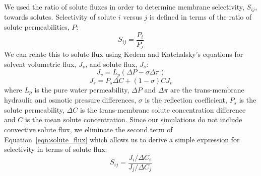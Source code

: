 \documentclass[12pt]{article}
\begin{document}
  We used the ratio of solute fluxes in order to determine membrane selectivity, $S_{ij}$,
  towards solutes. Selectivity of solute $i$ versus $j$ is defined in terms of the
  ratio of solute permeabilities, $P$:~\cite{guo_pervaporation_2004}
  \begin{equation}
  S_{ij} = \frac{P_i}{P_j}
  \end{equation}
  We can relate this to solute flux using Kedem and Katchalsky's equations for 
  solvent volumetric flux, $J_v$, and solute flux, $J_s$:~\cite{kedem_permeability_1963,al-zoubi_rejection_2007}
  \begin{equation}
  J_v = L_p(\Delta P - \sigma\Delta \pi)
  \end{equation} 
  \begin{equation}
  J_s = P_s \Delta C + (1 - \sigma)CJ_v
  \label{eqn:solute_flux}
  \end{equation}
  where $L_p$ is the pure water permeability, $\Delta P$ and $\Delta \pi$ are the 
  trans-membrane hydraulic and osmotic pressure differences, $\sigma$ is the reflection
  coefficient, $P_s$ is the solute permeability, $\Delta C$ is the trans-membrane
  solute concentration difference and $C$ is the mean solute concentration. Since our
  simulations do not include convective solute flux, we eliminate the second term 
  of Equation~\ref{eqn:solute_flux} which allows us to derive a simple expression
  for selectivity in terms of solute flux:
  \begin{equation}
  S_{ij} = \frac{J_i / \Delta C_i}{J_j / \Delta C_j}
  \label{eqn:selectivity}
  \end{equation}
  
  
  
  
\end{document}
